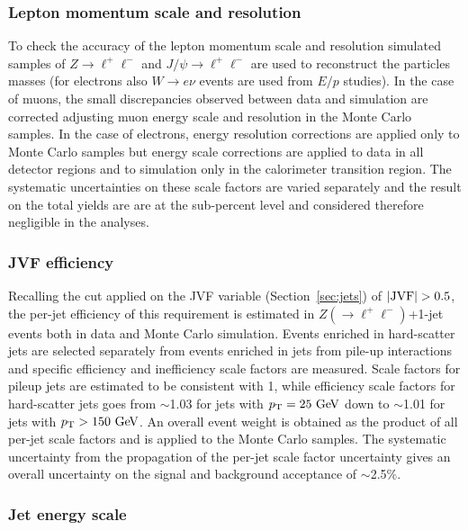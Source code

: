 \subsubsection{Lepton momentum scale and resolution}

To check the accuracy of the lepton momentum scale and resolution
simulated samples of $Z\to \ell^+\ell^-$ and $J/\psi \to \ell^+\ell^-$
are used to reconstruct the particles masses (for electrons also
 $W\to e\nu$ events are used from  $E/p$  studies). In the case of muons,
the small discrepancies observed between data and simulation are
corrected adjusting muon energy scale and resolution in the Monte Carlo
samples. In the case of electrons, energy resolution corrections
are applied only to Monte Carlo samples but energy scale corrections
are applied to data in all detector regions and to simulation only in 
the calorimeter transition region.
The systematic uncertainties on these scale factors are varied
separately and the result on the total yields are are at the 
sub-percent level and considered therefore negligible in the analyses.

\subsubsection{JVF efficiency}
\label{sec:syst_jvf}

Recalling the cut applied on the JVF variable (Section~\ref{sec:jets}) 
of $|{\rm JVF}|>0.5$, the per-jet efficiency of this requirement
is estimated in $Z(\to \ell^+\ell^-)$+1-jet events both in data and
Monte Carlo simulation. Events enriched in hard-scatter jets are selected
separately from events enriched in jets from pile-up interactions and
specific efficiency and inefficiency scale factors are measured.
Scale factors for pileup jets are estimated to be consistent with 1, while
efficiency scale factors for hard-scatter jets goes from $\sim$1.03 for jets with $\pt=25\gev$
down to $\sim$1.01 for jets with $\pt>150\gev$.
An overall event weight is obtained as the product of all per-jet scale factors
and is applied to the Monte Carlo samples.
The systematic uncertainty from the propagation of the per-jet scale
factor uncertainty gives an overall uncertainty on the signal
and background acceptance of $\sim$2.5\%.


\subsubsection{Jet energy scale}
\label{sec:syst_jes}

